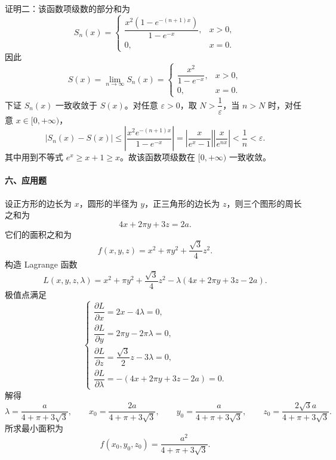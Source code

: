 证明二：该函数项级数的部分和为
\[
  S_n(x)=
  \begin{cases}
    \dfrac{x^2(1-e^{-(n+1)x})}{1-e^{-x}}, & x>0,\\
    0, & x=0.
  \end{cases}
\]
因此
\[
  S(x)=\lim_{n\to\infty}S_n(x)=
  \begin{cases}
    \dfrac{x^2}{1-e^{-x}}, & x>0,\\
    0, & x=0.
  \end{cases}
\]
下证 $S_n(x)$ 一致收敛于 $S(x)$。对任意 $\varepsilon>0$，取 $N>\dfrac1\varepsilon$，当 $n>N$ 时，对任意 $x\in[0,+\infty)$，
\[
  |S_n(x)-S(x)|
  \le \left|\frac{x^2e^{-(n+1)x}}{1-e^{-x}}\right|
  =\left|\frac{x}{e^x-1}\right|\left|\frac{x}{e^{nx}}\right|
  <\frac1n<\varepsilon.
\]
其中用到不等式 $e^x\ge x+1\ge x$。故该函数项级数在 $[0,+\infty)$ 一致收敛。

\paragraph*{六、应用题}
设正方形的边长为 $x$，圆形的半径为 $y$，正三角形的边长为 $z$，则三个图形的周长之和为
\[
  4x+2\pi y+3z=2a.
\]
它们的面积之和为
\[
  f(x,y,z)=x^2+\pi y^2+\frac{\sqrt3}{4}z^2.
\]
构造 Lagrange 函数
\[
  L(x,y,z,\lambda)
  =x^2+\pi y^2+\frac{\sqrt3}{4}z^2
  -\lambda(4x+2\pi y+3z-2a).
\]
极值点满足
\[
  \begin{cases}
    \dfrac{\partial L}{\partial x}=2x-4\lambda=0,\\
    \dfrac{\partial L}{\partial y}=2\pi y-2\pi\lambda=0,\\
    \dfrac{\partial L}{\partial z}=\dfrac{\sqrt3}{2}z-3\lambda=0,\\
    \dfrac{\partial L}{\partial \lambda}=-(4x+2\pi y+3z-2a)=0.
  \end{cases}
  \]
  解得
  \[
    \lambda=\frac{a}{4+\pi+3\sqrt3},\qquad
    x_0=\frac{2a}{4+\pi+3\sqrt3},\qquad
    y_0=\frac{a}{4+\pi+3\sqrt3},\qquad
    z_0=\frac{2\sqrt3a}{4+\pi+3\sqrt3}.
  \]
  所求最小面积为
  \[
    f(x_0,y_0,z_0)=\frac{a^2}{4+\pi+3\sqrt3}.
  \]
